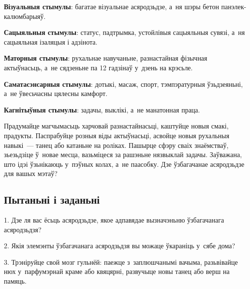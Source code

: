 \textbf{Візуальныя стымулы}: багатае візуальнае асяродзьдзе, а~ня шэры бетон панэлек-калюмбарыяў. 

\textbf{Сацыяльныя стымулы}: статус, падтрымка, устойлівыя сацыяльныя сувязі, а~ня сацыяльная ізаляцыя і адзінота. 

\textbf{Маторныя стымулы}: рухальнае навучаньне, разнастайная фізычная актыўнасьць, а~не сядзеньне па 12 гадзінаў у~дзень на крэсьле. 

\textbf{Саматасэнсарныя стымулы}: дотыкі, масаж, спорт, тэмпэратурныя ўзьдзеяньні, а~не ўвесьчасны цялесны камфорт.

\textbf{Кагнітыўныя стымулы}: задачы, выклікі, а~не манатонная праца.

Прадумайце магчымасьць харчовай разнастайнасьці, каштуйце новыя смакі, прадукты. Паспрабуйце розныя віды актыўнасьці, асвойце новыя рухальныя навыкі~--- танец або катаньне на роліках. Пашырце сфэру сваіх знаёмстваў, зьезьдзіце ў~новае месца, вазьміцеся за рашэньне нязвыклай задачы. Заўважана, што ідэі ўзьнікаюць у~пэўных колах, а~не паасобку. Дзе ўзбагачанае асяродзьдзе для вашых мэтаў?

\subsection*{Пытаньні і заданьні}

1. Дзе ля вас ёсьць асяродзьдзе, якое адпавядае вызначэньню ўзбагачанага асяродзьдзя?

2. Якія элемэнты ўзбагачанага асяродзьдзя вы можаце ўкараніць у~сябе дома?

3. Трэніруйце свой мозг гульнёй: паежце з~заплюшчанымі вачыма, разьвівайце нюх у~парфумэрнай краме або квяцярні, развучыце новы танец або верш на памяць.

